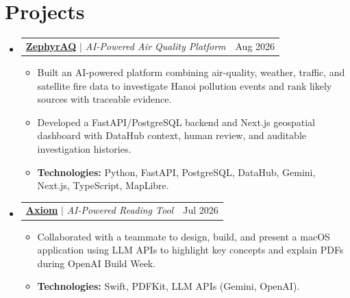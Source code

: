 \documentclass[a4paper,11pt]{article}
\makeatletter
\newcommand{\resumeItem}[1]{
  \item\small{
    {#1\par\vspace{-2pt}}
  }
}
\newcommand{\resumeProjectHeading}[2]{
  \item
    \begin{tabular*}{0.97\textwidth}{l@{\extracolsep{\fill}}r}
      \small#1 & #2 \\
    \end{tabular*}\vspace{-7pt}
}
\newcommand{\resumeSubHeadingListStart}{\begin{itemize}[leftmargin=0.15in, label={}]}
\newcommand{\resumeSubHeadingListEnd}{\end{itemize}}
\newcommand{\resumeItemListStart}{\begin{itemize}}
\newcommand{\resumeItemListEnd}{\end{itemize}\vspace{-5pt}}
\makeatother
\begin{document}
\section{Projects}
\resumeSubHeadingListStart
  \resumeProjectHeading
    {\textbf{\href{https://github.com/lhnminh/zephyr-aq}{ZephyrAQ}} $|$ \emph{AI-Powered Air Quality Platform}}{Aug 2026}
    \resumeItemListStart
      \resumeItem{Built an AI-powered platform combining air-quality, weather, traffic, and satellite fire data to investigate Hanoi pollution events and rank likely sources with traceable evidence.}
      \resumeItem{Developed a FastAPI/PostgreSQL backend and Next.js geospatial dashboard with DataHub context, human review, and auditable investigation histories.}
      \resumeItem{\textbf{Technologies:} Python, FastAPI, PostgreSQL, DataHub, Gemini, Next.js, TypeScript, MapLibre.}
    \resumeItemListEnd
  \resumeProjectHeading
    {\textbf{\href{https://github.com/lhnminh/axiom}{Axiom}} $|$ \emph{AI-Powered Reading Tool}}{Jul 2026}
    \resumeItemListStart
      \resumeItem{Collaborated with a teammate to design, build, and present a macOS application using LLM APIs to highlight key concepts and explain PDFs during OpenAI Build Week.}
      \resumeItem{\textbf{Technologies:} Swift, PDFKit, LLM APIs (Gemini, OpenAI).}
    \resumeItemListEnd
\resumeSubHeadingListEnd
\end{document}
